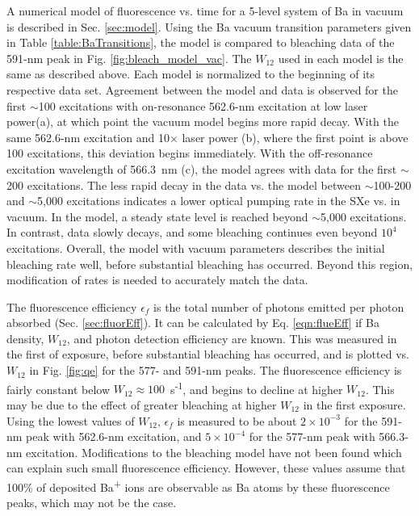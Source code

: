 A numerical model of fluorescence vs. time for a 5-level system of Ba in vacuum is described in Sec. \ref{sec:model}.  Using the Ba vacuum transition parameters given in Table \ref{table:BaTransitions}, the model is compared to bleaching data of the 591-nm peak in Fig. \ref{fig:bleach_model_vac}.  The $W_{12}$ used in each model is the same as described above.  Each model is normalized to the beginning of its respective data set.  Agreement between the model and data is observed for the first $\sim$100 excitations with on-resonance 562.6-nm excitation at low laser power(a), at which point the vacuum model begins more rapid decay.  With the same 562.6-nm excitation and 10$\times$ laser power (b), where the first point is above 100 excitations, this deviation begins immediately.  With the off-resonance excitation wavelength of 566.3~nm (c), the model agrees with data for the first $\sim$200 excitations.  The less rapid decay in the data vs. the model between $\sim$100-200 and $\sim$5,000 excitations indicates a lower optical pumping rate in the SXe vs. in vacuum.  In the model, a steady state level is reached beyond $\sim$5,000 excitations.  In contrast, data slowly decays, and some bleaching continues even beyond $10^{4}$ excitations.  Overall, the model with vacuum parameters describes the initial bleaching rate well, before substantial bleaching has occurred.  Beyond this region, modification of rates is needed to accurately match the data.

The fluorescence efficiency $\epsilon_{f}$ is the total number of photons emitted per photon absorbed (Sec. \ref{sec:fluorEff}).  It can be calculated by Eq. \ref{eqn:flueEff} if Ba density, $W_{12}$, and photon detection efficiency are known.  This was measured in the first of exposure, before substantial bleaching has occurred, and is plotted vs. $W_{12}$ in Fig. \ref{fig:qe} for the 577- and 591-nm peaks.  The fluorescence efficiency is fairly constant below $W_{12} \approx 100$~s\textsuperscript{-1}, and begins to decline at higher $W_{12}$.  This may be due to the effect of greater bleaching at higher $W_{12}$ in the first exposure.  Using the lowest values of $W_{12}$, $\epsilon_{f}$ is measured to be about $2 \times 10^{-3}$ for the 591-nm peak with 562.6-nm excitation, and $5 \times 10^{-4}$ for the 577-nm peak with 566.3-nm excitation.  Modifications to the bleaching model have not been found which can explain such small fluorescence efficiency.  However, these values assume that 100\% of deposited Ba\textsuperscript{+} ions are observable as Ba atoms by these fluorescence peaks, which may not be the case.

